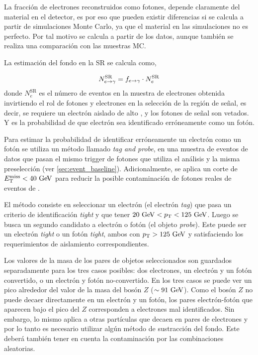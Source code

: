 La fracción de electrones reconstruidos como fotones, depende claramente del
material en el detector, es por eso que pueden existir diferencias si se calcula
a partir de simulaciones Monte Carlo, ya que el material en las simulaciones no
es perfecto. Por tal motivo se calcula a partir de los datos, aunque también se
realiza una comparación con las muestras MC.

La estimación del fondo en la SR se calcula como,

\begin{equation}
  N_{e\rightarrow\gamma}^{\mathrm{SR}} = f_{e\rightarrow\gamma} \cdot N_e^{\mathrm{SR}}
\end{equation}
%
donde $N_e^{\mathrm{SR}}$ es el número de eventos en la muestra de electrones
obtenida invirtiendo el rol de fotones y electrones en la selección de la región
de señal, es decir, se requiere un electrón aislado de alto {\pt}, y los fotones de señal son
vetados. Y {\feg} es la probabilidad de que electrón sea identificado
erróneamente como un fotón.


Para estimar la probabilidad de identificar erróneamente un electrón como un
fotón {\feg} se utiliza un método llamado \emph{tag and probe}, en una muestra
de eventos de datos {\Zee} que pasan el mismo trigger de fotones que utiliza el
análisis y la misma preselección (ver \cref{sec:event_baseline}). Adicionalmente, se
aplica un corte de $\met < 40 \gev$ para reducir la posible contaminación de
fotones reales de eventos de {\wgam}.

El método consiste en seleccionar un electrón (el electrón \emph{tag}) que
pasa un criterio de identificación \emph{tight} y que tener $20
\gev < \pt < 125 \gev$. Luego se busca un segundo candidato a electrón o fotón
(el objeto \emph{probe}). Este puede ser un electrón \emph{tight} o un fotón
\emph{tight}, ambos con $\pt > 125\gev$ y satisfaciendo los requerimientos de
aislamiento correspondientes.

Los valores de la masa de los pares de objetos seleccionados son guardados
separadamente para los tres casos posibles: dos electrones, un electrón y un
fotón convertido, o un electrón y fotón no-convertido. En los tres casos se
puede ver un pico alrededor del valor de la masa del bosón $Z$ ($\sim 91
\gev$).
Como el bosón $Z$ no puede decaer directamente en un electrón y un fotón, los
pares electrón-fotón que aparecen bajo el pico del $Z$ corresponden a electrones
mal identificados. Sin embargo, lo mismo aplica a otras partículas que decaen en
pares de electrones y por lo tanto es necesario utilizar algún método de
sustracción del fondo. Este deberá también tener en cuenta la contaminación por
las combinaciones aleatorias.

